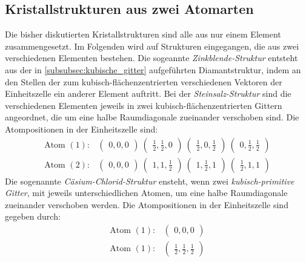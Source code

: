 \subsection{Kristallstrukturen aus zwei Atomarten}
\label{subsec:2atome}
Die bisher diskutierten Kristallstrukturen sind alle aus nur
einem Element zusammengesetzt. Im Folgenden wird auf Strukturen
eingegangen, die aus zwei verschiedenen Elementen bestehen.
Die sogeannte \textit{Zinkblende-Struktur} entsteht aus der
in \ref{subsubsec:kubische_gitter}
aufgeführten Diamantstruktur, indem an den Stellen der zum
kubisch-flächenzentrierten verschiedenen Vektoren der Einheitszelle
ein anderer Element auftritt.
Bei der \textit{Steinsalz-Struktur}
sind die verschiedenen Elementen
jeweils in zwei kubisch-flächenzentrierten Gittern angeordnet, die um eine
halbe Raumdiagonale zueinander verschoben sind. Die Atompositionen
in der Einheitszelle sind:
\begin{align}
\label{eqn:5*}
\text{Atom }(1) :&
\begin{pmatrix}
0, 0, 0
\end{pmatrix}\
\begin{pmatrix}
\frac{1}{2}, \frac{1}{2}, 0
\end{pmatrix}\
\begin{pmatrix}
\frac{1}{2}, 0, \frac{1}{2}
\end{pmatrix}\
\begin{pmatrix}
0, \frac{1}{2}, \frac{1}{2}
\end{pmatrix}\\
\label{eqn:6*}
\text{Atom }(2) :&
\begin{pmatrix}
0, 0, 0
\end{pmatrix}\
\begin{pmatrix}
1, 1, \frac{1}{2}
\end{pmatrix}\
\begin{pmatrix}
1, \frac{1}{2}, 1
\end{pmatrix}\
\begin{pmatrix}
\frac{1}{2}, 1, 1
\end{pmatrix}
\end{align}
Die sogenannte \textit{Cäsium-Chlorid-Struktur}
ensteht, wenn zwei \textit{kubisch-primitive Gitter}, mit jeweils
unterschiedlichen Atomen, um eine halbe Raumdiagonale zueinander
verschoben werden. Die Atompositionen in der Einheitszelle
sind gegeben durch:
\begin{align}
\label{eqn:7*}
\text{Atom }(1) :&
\begin{pmatrix}
0, 0, 0
\end{pmatrix}\\
\label{eqn:8*}
\text{Atom }(1) :&
\begin{pmatrix}
\frac{1}{2}, \frac{1}{2}, \frac{1}{2}
\end{pmatrix}
\end{align}
